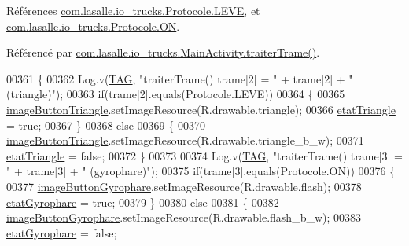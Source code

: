 Références \hyperlink{_protocole_8java_source_l00027}{com.\+lasalle.\+io\+\_\+trucks.\+Protocole.\+L\+E\+VE}, et \hyperlink{_protocole_8java_source_l00019}{com.\+lasalle.\+io\+\_\+trucks.\+Protocole.\+ON}.



Référencé par \hyperlink{_main_activity_8java_source_l00348}{com.\+lasalle.\+io\+\_\+trucks.\+Main\+Activity.\+traiter\+Trame()}.


\begin{DoxyCode}
00361     \{
00362         Log.v(\hyperlink{classcom_1_1lasalle_1_1io__trucks_1_1_main_activity_a37b90dba972711328e3f4c83c55eb0fc}{TAG}, \textcolor{stringliteral}{"traiterTrame() trame[2] = "} + trame[2] + \textcolor{stringliteral}{" (triangle)"});
00363         \textcolor{keywordflow}{if}(trame[2].equals(Protocole.LEVE))
00364         \{
00365             \hyperlink{classcom_1_1lasalle_1_1io__trucks_1_1_main_activity_abe65c5762df1b63ee18b51fcb1bb23c8}{imageButtonTriangle}.setImageResource(R.drawable.triangle);
00366             \hyperlink{classcom_1_1lasalle_1_1io__trucks_1_1_main_activity_a25509a0ae84110cdb8957c51b149213f}{etatTriangle} = \textcolor{keyword}{true};
00367         \}
00368         \textcolor{keywordflow}{else}
00369         \{
00370             \hyperlink{classcom_1_1lasalle_1_1io__trucks_1_1_main_activity_abe65c5762df1b63ee18b51fcb1bb23c8}{imageButtonTriangle}.setImageResource(R.drawable.triangle\_b\_w);
00371             \hyperlink{classcom_1_1lasalle_1_1io__trucks_1_1_main_activity_a25509a0ae84110cdb8957c51b149213f}{etatTriangle} = \textcolor{keyword}{false};
00372         \}
00373 
00374         Log.v(\hyperlink{classcom_1_1lasalle_1_1io__trucks_1_1_main_activity_a37b90dba972711328e3f4c83c55eb0fc}{TAG}, \textcolor{stringliteral}{"traiterTrame() trame[3] = "} + trame[3] + \textcolor{stringliteral}{" (gyrophare)"});
00375         \textcolor{keywordflow}{if}(trame[3].equals(Protocole.ON))
00376         \{
00377             \hyperlink{classcom_1_1lasalle_1_1io__trucks_1_1_main_activity_aed3dc707e8acf48e821ebda3312a0dca}{imageButtonGyrophare}.setImageResource(R.drawable.flash);
00378             \hyperlink{classcom_1_1lasalle_1_1io__trucks_1_1_main_activity_ac19484cc818434d89d35933a8cbb2b63}{etatGyrophare} = \textcolor{keyword}{true};
00379         \}
00380         \textcolor{keywordflow}{else}
00381         \{
00382             \hyperlink{classcom_1_1lasalle_1_1io__trucks_1_1_main_activity_aed3dc707e8acf48e821ebda3312a0dca}{imageButtonGyrophare}.setImageResource(R.drawable.flash\_b\_w);
00383             \hyperlink{classcom_1_1lasalle_1_1io__trucks_1_1_main_activity_ac19484cc818434d89d35933a8cbb2b63}{etatGyrophare} = \textcolor{keyword}{false};

\end{DoxyCode}
